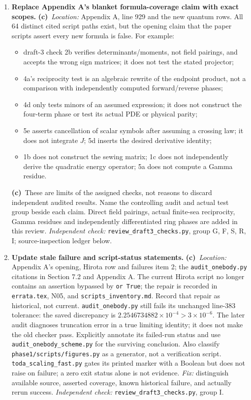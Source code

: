 \documentclass[11pt,a4paper]{article}
\newcommand{\C}{\textbf{(c)}\ }
\newcommand{\file}[1]{\nolinkurl{#1}}
\newcommand{\test}[1]{\textit{Independent check:} \file{review_draft3_checks.py}, group #1.}
\begin{document}
\begin{enumerate}[label=\textbf{R\arabic*.},leftmargin=*,itemsep=1.2em]
\item \textbf{Replace Appendix A's blanket formula-coverage claim with exact scopes.}
\C \textit{Location:} Appendix A, line 929 and the new quantum rows.
All 64 distinct cited script paths exist, but the opening claim that the
paper scripts assert every new formula is false. For example:
\begin{itemize}[nosep]
\item draft-3 check 2b verifies determinants/moments, not field pairings,
and accepts the wrong sign matrices; it does not test the stated projector;
\item 4a's reciprocity test is an algebraic rewrite of the endpoint product,
not a comparison with independently computed forward/reverse phases;
\item 4d only tests minors of an assumed expression; it does not construct
the four-term phase or test its actual PDE or physical parity;
\item 5e asserts cancellation of scalar symbols after assuming a crossing
law; it does not integrate $J$; 5d inserts the desired derivative identity;
\item 1b does not construct the sewing matrix; 1c does not independently
derive the quadratic energy operator; 5a does not compute a Gamma residue.
\end{itemize}
\C These are limits of the assigned checks, not reasons to discard
independent audited results. Name the controlling audit and actual test
group beside each claim. Direct field pairings, actual finite-sea reciprocity,
Gamma residues and independently differentiated ring phases are added in
this review. \test{G, F, S, R, I; source-inspection ledger below}

\item \textbf{Update stale failure and script-status statements.}
\C \textit{Location:} Appendix A's opening, Hirota row and failures item 2;
the \file{audit_onebody.py} citations in Section 7.2 and Appendix A.
The current Hirota script no longer contains an assertion bypassed by
\file{or True}; the repair is recorded in \file{errata.tex}, N05, and
\file{scripts_inventory.md}. Record that repair as historical, not current.
\file{audit_onebody.py} still fails its unchanged line-383 tolerance:
the saved discrepancy is $2.2546734882\times10^{-4}>3\times10^{-6}$.
The later audit diagnoses truncation error in a true limiting identity;
it does not make the old checker pass. Explicitly annotate its failed-run
status and use \file{audit_onebody_scheme.py} for the surviving conclusion.
Also classify \file{phase1/scripts/figures.py} as a generator, not a
verification script. \file{toda_scaling_fast.py} gates its printed marker
with a Boolean but does not raise on failure; a zero exit status alone is
not evidence. \textit{Fix:} distinguish available source, asserted coverage,
known historical failure, and actually rerun success. \test{I}
\end{enumerate}
\end{document}

